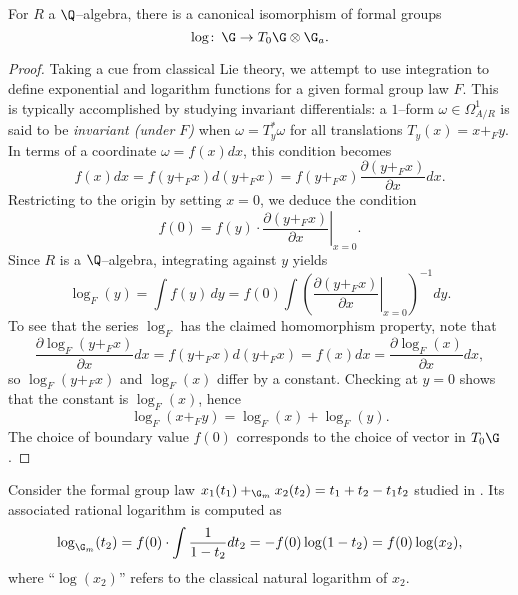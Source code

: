 \begin{theorem}\label{RationalFGLsHaveLogarithms}
For $R$ a $\Q$--algebra, there is a canonical isomorphism of formal groups \[\log\co \G \to T_0 \G \otimes \G_a.\]
\end{theorem}
\begin{proof}
Taking a cue from classical Lie theory, we attempt to use integration to define exponential and logarithm functions for a given formal group law $F$.  This is typically accomplished by studying invariant differentials: a $1$--form $\omega \in \Omega^1_{A/R}$ is said to be \textit{invariant (under $F$)} when $\omega = T_y^* \omega$ for all translations $T_y(x) = x +_F y$.  In terms of a coordinate $\omega = f(x) dx$, this condition becomes \[f(x) dx = f(y +_F x) d(y +_F x) = f(y +_F x) \frac{\partial(y +_F x)}{\partial x} dx.\]  Restricting to the origin by setting $x = 0$, we deduce the condition \[f(0) = f(y) \cdot \left. \frac{\partial(y +_F x)}{\partial x} \right|_{x=0}.\]  Since $R$ is a $\Q$--algebra, integrating against $y$ yields \[\log_F(y) = \int f(y) \, dy = f(0) \int \left( \left. \frac{\partial(y +_F x)}{\partial x} \right|_{x=0} \right)^{-1} dy.\]  To see that the series $\log_F$ has the claimed homomorphism property, note that \[\frac{\partial \log_F(y +_F x)}{\partial x} dx = f(y +_F x) d(y +_F x) = f(x) dx = \frac{\partial \log_F(x)}{\partial x} dx,\] so $\log_F(y +_F x)$ and $\log_F(x)$ differ by a constant.  Checking at $y = 0$ shows that the constant is $\log_F(x)$, hence \[\log_F(x +_F y) = \log_F(x) + \log_F(y).\]  The choice of boundary value $f(0)$ corresponds to the choice of vector in $T_0 \G$.
\end{proof}

\begin{example}\label{GmAndItsLogExample}
Consider the formal group law $x_1(t_1) +_{\G_m} x_2(t_2) = t_1 + t_2 - t_1 t_2$ studied in .  Its associated rational logarithm is computed as \[\log_{\G_m}(t_2) = f(0) \cdot \int \frac{1}{1 - t_2} dt_2 = -f(0) \log(1 - t_2) = f(0) \log(x_2),\] where ``$\log(x_2)$'' refers to the classical natural logarithm of $x_2$.
\end{example}









